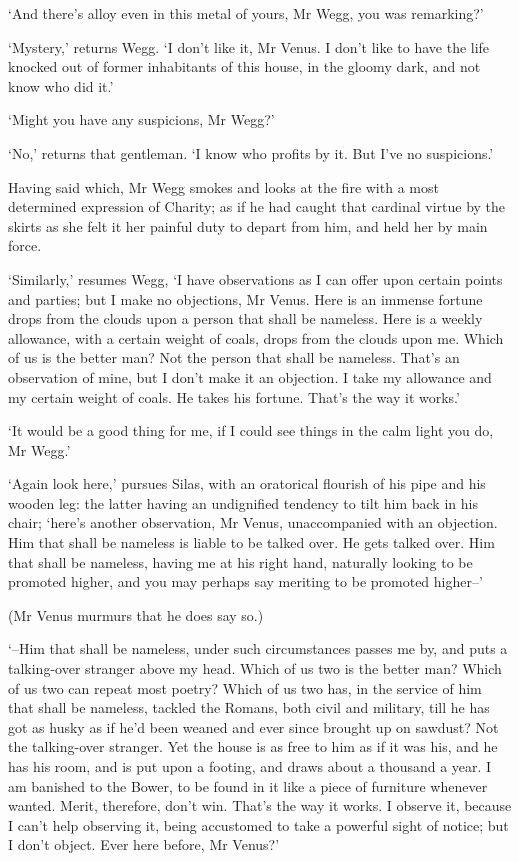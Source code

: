 ‘And there’s alloy even in this metal of yours, Mr Wegg, you was
remarking?’

‘Mystery,’ returns Wegg. ‘I don’t like it, Mr Venus. I don’t like to
have the life knocked out of former inhabitants of this house, in the
gloomy dark, and not know who did it.’

‘Might you have any suspicions, Mr Wegg?’

‘No,’ returns that gentleman. ‘I know who profits by it. But I’ve no
suspicions.’

Having said which, Mr Wegg smokes and looks at the fire with a most
determined expression of Charity; as if he had caught that cardinal
virtue by the skirts as she felt it her painful duty to depart from him,
and held her by main force.

‘Similarly,’ resumes Wegg, ‘I have observations as I can offer upon
certain points and parties; but I make no objections, Mr Venus. Here
is an immense fortune drops from the clouds upon a person that shall be
nameless. Here is a weekly allowance, with a certain weight of coals,
drops from the clouds upon me. Which of us is the better man? Not the
person that shall be nameless. That’s an observation of mine, but I
don’t make it an objection. I take my allowance and my certain weight of
coals. He takes his fortune. That’s the way it works.’

‘It would be a good thing for me, if I could see things in the calm
light you do, Mr Wegg.’

‘Again look here,’ pursues Silas, with an oratorical flourish of his
pipe and his wooden leg: the latter having an undignified tendency
to tilt him back in his chair; ‘here’s another observation, Mr Venus,
unaccompanied with an objection. Him that shall be nameless is liable to
be talked over. He gets talked over. Him that shall be nameless, having
me at his right hand, naturally looking to be promoted higher, and you
may perhaps say meriting to be promoted higher--’

(Mr Venus murmurs that he does say so.)

‘--Him that shall be nameless, under such circumstances passes me by,
and puts a talking-over stranger above my head. Which of us two is the
better man? Which of us two can repeat most poetry? Which of us two has,
in the service of him that shall be nameless, tackled the Romans, both
civil and military, till he has got as husky as if he’d been weaned and
ever since brought up on sawdust? Not the talking-over stranger. Yet the
house is as free to him as if it was his, and he has his room, and is
put upon a footing, and draws about a thousand a year. I am banished to
the Bower, to be found in it like a piece of furniture whenever wanted.
Merit, therefore, don’t win. That’s the way it works. I observe it,
because I can’t help observing it, being accustomed to take a powerful
sight of notice; but I don’t object. Ever here before, Mr Venus?’

